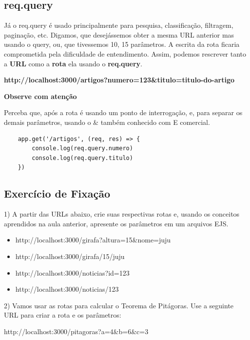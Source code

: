 \subsection{req.query}

Já o req.query é usado principalmente para pesquisa, classificação, filtragem, paginação, etc. Digamos, que desejássemos obter a mesma URL anterior mas usando o query, ou, que tivessemos 10, 15 parâmetros. A escrita da rota ficaria comprometida pela dificuldade de entendimento. Assim, podemos rescrever tanto a \textbf{URL} como a \textbf{rota} ela usando o \textbf{req.query}. 

\textbf{http://localhost:3000/artigos?numero=123\&titulo=titulo-do-artigo}

\textbf{Observe com atenção}

Perceba que, após a rota é usando um ponto de interrogação, e, para separar os demais parâmetros, usando o \& também conhecido com E comercial.

\begin{verbatim}
	app.get('/artigos', (req, res) => {
		console.log(req.query.numero)
		console.log(req.query.titulo)
	})	
\end{verbatim}

\subsection{Exercício de Fixação}

1) A partir das URLs abaixo, crie suas respectivas rotas e, usando os conceitos aprendidos na aula anterior, apresente os parâmetros em um arquivos EJS.

\begin{itemize}[leftmargin=1.7cm]
	\setlength\itemsep{0em}
	\item http://localhost:3000/girafa?altura=15\&nome=juju
	\item http://localhost:3000/girafa/15/juju
	\item http://localhost:3000/noticias?id=123
	\item http://localhost:3000/noticias/123
\end{itemize}

2) Vamos usar as rotas para calcular o Teorema de Pitágoras. Use a seguinte URL para criar a rota e os parâmetros:

http://localhost:3000/pitagoras?a=4\&b=6\&c=3

\begin{figure}[H]
	\centering
\end{figure}